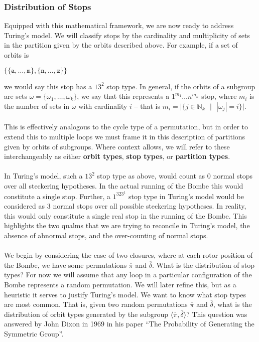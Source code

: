 \subsubsection{Distribution of Stops}
Equipped with this mathematical framework, we are now ready to address
Turing's model. We will classify stops by the cardinality and
multiplicity of sets in the partition given by the orbits described
above. For example, if a set of orbits is
\begin{center}
  $\{\{\texttt{a}, \dots, \texttt{m}\}, \{\texttt{n}, \dots, \texttt{z}\}\}$
\end{center}
we would say this stop has a $13^2$ stop type. In general, if the
orbits of a subgroup are sets $\omega = \{\omega_1,\dots,\omega_k\}$,
we say that this represents a $1^{m_1}\dots n^{m_n}$ stop, where
${m_i}$ is the number of sets in $\omega$ with cardinality $i$ --
that is $m_i =|\{j\in\mathbb{N}_k\text{ }|\text{ }|\omega_j| = i\}|$.
\\\\This is effectively
analogous to the cycle type of a permutation, but in order to extend
this to multiple loops we must frame it in this description of
partitions given by orbits of subgroups. Where context allows, we
will refer to these interchangeably as  either {\bf{orbit types}},
{\bf{stop types}}, or {\bf{partition types}}.
\\\\In Turing's model, such a $13^2$ stop type as above, would count as
$0$ normal stops over all steckering hypotheses. In the actual
running of the Bombe this would constitute a single stop. Further, a
$1^323^1$ stop type in Turing's model would be considered as $3$ normal
stops over all possible steckering hypotheses. In reality, this would
only constitute a single real stop in the running of the Bombe. This
highlights the two qualms that we are trying to reconcile in Turing's
model, the absence of abnormal stops, and the over-counting of normal stops.
\\\\We begin by considering the case of two closures, where at each
rotor position of the Bombe, we have some permutations $\overline\pi$
and $\overline\delta$. What is the distribution of stop types? For
now we will assume that any loop in a particular configuration of the
Bombe represents a random permutation. We will later refine this, but
as a heuristic it serves to justify Turing's model. We want to know
what stop types are most common. That is, given two random
permutations $\overline\pi$ and $\overline\delta$, what is the
distribution of orbit types generated by the subgroup
$\langle\overline\pi, \overline\delta\rangle$? This question was
answered by John Dixon in 1969 in his paper ``The Probability of
Generating the Symmetric Group''.


